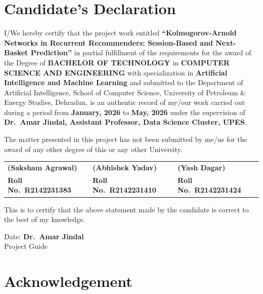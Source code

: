 \documentclass[12pt,a4paper]{report}
\begin{document}

% 
% 
\chapter*{Candidate's Declaration}

I/We hereby certify that the project work entitled
\textbf{``Kolmogorov-Arnold Networks in Recurrent Recommenders: Session-Based and
Next-Basket Prediction''}
in partial fulfillment of the requirements for the award of the Degree of
\textbf{BACHELOR OF TECHNOLOGY} in
\textbf{COMPUTER SCIENCE AND ENGINEERING}
with specialization in \textbf{Artificial Intelligence and Machine Learning}
and submitted to the Department of Artificial Intelligence, School of Computer Science,
University of Petroleum \& Energy Studies, Dehradun, is an authentic record of
my/our work carried out during a period from \textbf{January, 2026} to
\textbf{May, 2026} under the supervision of
\textbf{Dr.\ Amar Jindal, Assistant Professor, Data Science Cluster, UPES}.

The matter presented in this project has not been submitted by me/us for the award
of any other degree of this or any other University.

\vspace{2cm}

\noindent
\begin{tabular}{p{4cm} p{4cm} p{4cm}}
\textbf{(Saksham Agrawal)} & \textbf{(Abhishek Yadav)} & \textbf{(Yash Dagar)} \\
\textbf{Roll No.\ R2142231383} & \textbf{Roll No.\ R2142231410} & \textbf{Roll No.\ R2142231424} \\
\end{tabular}

\vspace{1.5cm}
\noindent
This is to certify that the above statement made by the candidate is correct to the
best of my knowledge.

\vspace{1.5cm}

\noindent
Date: \underline{\hspace{3cm}} \hfill \textbf{Dr.\ Amar Jindal}\\
\hfill Project Guide

% 
% 
\chapter*{Acknowledgement}
\end{document}
